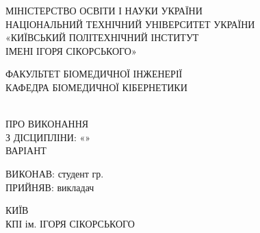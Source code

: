 \begin{titlepage}
    \begin{center}
        \Large
        МІНІСТЕРСТВО ОСВІТИ І НАУКИ УКРАЇНИ \\
        НАЦІОНАЛЬНИЙ ТЕХНІЧНИЙ УНІВЕРСИТЕТ УКРАЇНИ \\
        «КИЇВСЬКИЙ ПОЛІТЕХНІЧНИЙ ІНСТИТУТ \\
        ІМЕНІ ІГОРЯ СІКОРСЬКОГО»

        ФАКУЛЬТЕТ БІОМЕДИЧНОЇ ІНЖЕНЕРІЇ \\
        КАФЕДРА БІОМЕДИЧНОЇ КІБЕРНЕТИКИ
    \end{center}

    \vfill

    \begin{center}
        \Large
        \TITLE \\
        ПРО ВИКОНАННЯ \SUBJECT \\
        З ДІСЦИПЛІНИ: «\DISCIPLINE» \\
        ВАРІАНТ \VARIANT
    \end{center}

    \vfill

    \begin{minipage}{\textwidth}
        \Large
        ВИКОНАВ: студент гр. \GROUP \;
         \\

        ПРИЙНЯВ: викладач \;
        \hfill
        \hfill
    \end{minipage}

    \vfill

    \begin{center}
        \Large
        КИЇВ \\
        КПІ ім. ІГОРЯ СІКОРСЬКОГО \\
        \the\year{}
    \end{center}
\end{titlepage}
